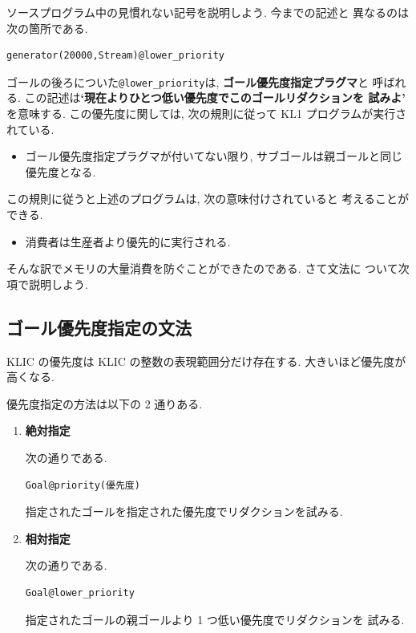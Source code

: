 \documentclass[a4,titlepage]{jsreport}
\let\dg\bf
\begin{document}
ソースプログラム中の見慣れない記号を説明しよう.  今までの記述と
異なるのは次の箇所である.  
\begin{center}
\begin{minipage}{12cm}
\begin{verbatim}
generator(20000,Stream)@lower_priority
\end{verbatim}
\end{minipage}
\end{center}

ゴールの後ろについた\verb|@lower_priority|は, {\dg ゴール優先度指定プラグマ}と
呼ばれる.  この記述は{\dg `現在よりひとつ低い優先度でこのゴールリダクションを
試みよ'} を意味する.  この優先度に関しては, 
次の規則に従って KL1 プログラムが実行されている.  
\begin{itemize}
\item ゴール優先度指定プラグマが付いてない限り, サブゴールは親ゴールと同じ優先度となる.  
\end{itemize}
この規則に従うと上述のプログラムは, 次の意味付けされていると
考えることができる.  
\begin{itemize}
\item 消費者は生産者より優先的に実行される.  
\end{itemize}
そんな訳でメモリの大量消費を防ぐことができたのである.  さて文法に
ついて次項で説明しよう.  

\subsection{ゴール優先度指定の文法}

KLIC の優先度は KLIC の整数の表現範囲分だけ存在する.  
大きいほど優先度が高くなる.  

優先度指定の方法は以下の 2 通りある.  
\begin{enumerate}
\item {\dg 絶対指定}

次の通りである.  

\begin{center}
\begin{Verbatim}[frame=single]
Goal@priority(優先度)
\end{Verbatim}
\end{center}

指定されたゴールを指定された優先度でリダクションを試みる.  

\item {\dg 相対指定}

次の通りである.  

\begin{center}
\begin{Verbatim}[frame=single]
Goal@lower_priority
\end{Verbatim}
\end{center}

指定されたゴールの親ゴールより 1 つ低い優先度でリダクションを
試みる.  
\end{enumerate}
\end{document}
